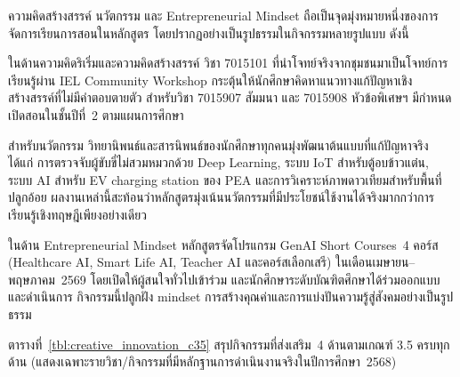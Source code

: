 
ความคิดสร้างสรรค์ นวัตกรรม และ Entrepreneurial Mindset ถือเป็นจุดมุ่งหมายหนึ่งของการจัดการเรียนการสอนในหลักสูตร โดยปรากฏอย่างเป็นรูปธรรมในกิจกรรมหลายรูปแบบ ดังนี้

ในด้านความคิดริเริ่มและความคิดสร้างสรรค์ วิชา 7015101 ที่นำโจทย์จริงจากชุมชนมาเป็นโจทย์การเรียนรู้ผ่าน IEL Community Workshop กระตุ้นให้นักศึกษาคิดหาแนวทางแก้ปัญหาเชิงสร้างสรรค์ที่ไม่มีคำตอบตายตัว สำหรับวิชา 7015907 สัมมนา และ 7015908 หัวข้อพิเศษฯ มีกำหนดเปิดสอนในชั้นปีที่~2 ตามแผนการศึกษา

สำหรับนวัตกรรม วิทยานิพนธ์และสารนิพนธ์ของนักศึกษาทุกคนมุ่งพัฒนาต้นแบบที่แก้ปัญหาจริง ได้แก่ การตรวจจับผู้ขับขี่ไม่สวมหมวกด้วย Deep Learning, ระบบ IoT สำหรับตู้อบข้าวแต๋น, ระบบ AI สำหรับ EV charging station ของ PEA และการวิเคราะห์ภาพดาวเทียมสำหรับพื้นที่ปลูกอ้อย ผลงานเหล่านี้สะท้อนว่าหลักสูตรมุ่งเน้นนวัตกรรมที่มีประโยชน์ใช้งานได้จริงมากกว่าการเรียนรู้เชิงทฤษฎีเพียงอย่างเดียว

ในด้าน Entrepreneurial Mindset หลักสูตรจัดโปรแกรม GenAI Short Courses~4 คอร์ส (Healthcare AI, Smart Life AI, Teacher AI และคอร์สเลือกเสรี) ในเดือนเมษายน--พฤษภาคม~2569 โดยเปิดให้ผู้สนใจทั่วไปเข้าร่วม และนักศึกษาระดับบัณฑิตศึกษาได้ร่วมออกแบบและดำเนินการ กิจกรรมนี้ปลูกฝัง mindset การสร้างคุณค่าและการแบ่งปันความรู้สู่สังคมอย่างเป็นรูปธรรม

ตารางที่~\ref{tbl:creative_innovation_c35} สรุปกิจกรรมที่ส่งเสริม~4 ด้านตามเกณฑ์ 3.5 ครบทุกด้าน (แสดงเฉพาะรายวิชา/กิจกรรมที่มีหลักฐานการดำเนินงานจริงในปีการศึกษา~2568)

